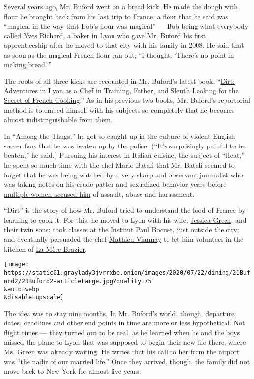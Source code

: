 Several years ago, Mr. Buford went on a bread kick. He made the dough
with flour he brought back from his last trip to France, a flour that he
said was ``magical in the way that Bob's flour was magical'' --- Bob
being what everybody called Yves Richard, a baker in Lyon who gave Mr.
Buford his first apprenticeship after he moved to that city with his
family in 2008. He said that as soon as the magical French flour ran
out, ``I thought, `There's no point in making bread.'''

The roots of all three kicks are recounted in Mr. Buford's latest book,
``\href{https://www.nytimes3xbfgragh.onion/2020/05/25/books/review-dirt-bill-buford.html?searchResultPosition=1}{Dirt:
Adventures in Lyon as a Chef in Training, Father, and Sleuth Looking for
the Secret of French Cooking}.'' As in his previous two books, Mr.
Buford's reportorial method is to embed himself with his subjects so
completely that he becomes almost indistinguishable from them.

In ``Among the Thugs,'' he got so caught up in the culture of violent
English soccer fans that he was beaten up by the police. (``It's
surprisingly painful to be beaten,'' he said.) Pursuing his interest in
Italian cuisine, the subject of ``Heat,'' he spent so much time with the
chef Mario Batali that Mr. Batali seemed to forget that he was being
watched by a very sharp and observant journalist who was taking notes on
his crude patter and sexualized behavior years before
\href{https://www.nytimes3xbfgragh.onion/2019/03/06/dining/mario-batali-bastianich-restaurants.html}{multiple
women accused him} of assault, abuse and harassment.

``Dirt'' is the story of how Mr. Buford tried to understand the food of
France by learning to cook it. For this, he moved to Lyon with his wife,
\href{https://twitter.com/jessicahgreen}{Jessica Green}, and their twin
sons; took classes at the
\href{https://en.institutpaulbocuse.com/}{Institut Paul Bocuse}, just
outside the city; and eventually persuaded the chef
\href{https://www.instagram.com/mathieuviannay/}{Mathieu Viannay} to let
him volunteer in the kitchen of \href{https://lamerebrazier.fr/en/}{La
Mère Brazier}.

\texttt{[image: https://static01.graylady3jvrrxbe.onion/images/2020/07/22/dining/21Buford2/21Buford2-articleLarge.jpg?quality=75\\\&auto=webp\\\&disable=upscale]}

The idea was to stay nine months. In Mr. Buford's world, though,
departure dates, deadlines and other end points in time are more or less
hypothetical. Not flight times --- they turned out to be real, as he
learned when he and the boys missed the plane to Lyon that was supposed
to begin their new life there, where Ms. Green was already waiting. He
writes that his call to her from the airport was ``the nadir of our
married life.'' Once they arrived, though, the family did not move back
to New York for almost five years.

